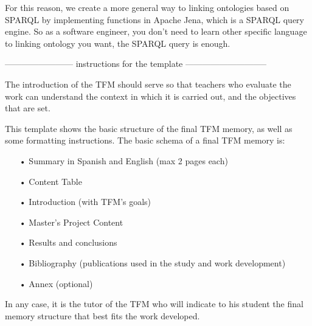 For this reason, we create a more general way to linking ontologies based on SPARQL by implementing functions in Apache Jena, which is a SPARQL query engine. So as a software engineer, you don't need to learn other specific language to linking ontology you want, the SPARQL query is enough.








\newpage


------------------------ instructions for the template -----------------------------


The introduction of the TFM should serve so that teachers who evaluate the work can understand the context in which it is carried out, and the objectives that are set.

This template shows the basic structure of the final TFM memory, as well as some formatting instructions.
The basic schema of a final  TFM memory is:
\begin{itemize}
\item[•] Summary in Spanish and English (max 2 pages each)
\item[•] Content Table
\item[•] Introduction (with TFM's goals)
\item[•] Master’s Project Content
\item[•] Results and conclusions
\item[•] Bibliography (publications used in the study and work development)
\item[•] Annex (optional)
\end{itemize}


In any case, it is the tutor of the TFM who will indicate to his student the final memory structure that best fits the work developed.

